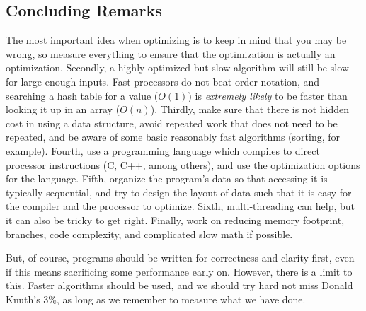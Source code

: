 \subsection{Concluding Remarks}

The most important idea when optimizing is to keep in mind that you may be wrong, so measure everything to ensure that the optimization
is actually an optimization. Secondly, a highly optimized but slow algorithm will still be slow for large enough inputs. Fast processors
do not beat order notation, and searching a hash table for a value ($O(1)$) is \textit{extremely likely} to be faster than looking it up
in an array ($O(n)$). Thirdly, make sure that there is not hidden cost in using a data structure, avoid repeated work that does not need to be repeated,
and be aware of some basic reasonably fast algorithms (sorting, for example). Fourth, use a programming language which compiles to direct processor
instructions (C, C++, among others), and use the optimization options for the language. Fifth, organize the program's data so that accessing it is
typically sequential, and try to design the layout of data such that it is easy for the compiler and the processor to optimize. Sixth, multi-threading
can help, but it can also be tricky to get right. Finally, work on reducing memory footprint, branches, code complexity, and complicated slow
math if possible.

But, of course, programs should be written for correctness and clarity first, even if this means sacrificing some performance early on. However,
there is a limit to this. Faster algorithms should be used, and we should try hard not miss Donald Knuth's 3\%, as long as we remember to measure
what we have done.

